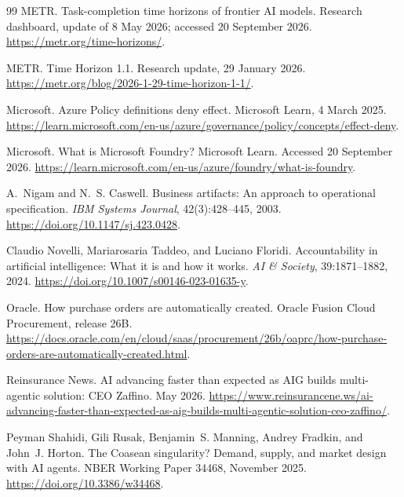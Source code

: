 \begin{thebibliography}{99}
METR.
\newblock Task-completion time horizons of frontier AI models.
\newblock Research dashboard, update of 8 May 2026; accessed 20 September 2026.
\newblock \url{https://metr.org/time-horizons/}.

METR.
\newblock Time Horizon 1.1. Research update, 29 January 2026.
\newblock \url{https://metr.org/blog/2026-1-29-time-horizon-1-1/}.

Microsoft.
\newblock Azure Policy definitions deny effect. Microsoft Learn, 4 March 2025.
\newblock \url{https://learn.microsoft.com/en-us/azure/governance/policy/concepts/effect-deny}.

Microsoft.
\newblock What is Microsoft Foundry? Microsoft Learn.
\newblock Accessed 20 September 2026.
\newblock \url{https://learn.microsoft.com/en-us/azure/foundry/what-is-foundry}.

A.~Nigam and N.~S. Caswell.
\newblock Business artifacts: An approach to operational specification.
\newblock \emph{IBM Systems Journal}, 42(3):428--445, 2003.
\newblock \url{https://doi.org/10.1147/sj.423.0428}.

Claudio Novelli, Mariarosaria Taddeo, and Luciano Floridi.
\newblock Accountability in artificial intelligence: What it is and how it works.
\newblock \emph{AI \& Society}, 39:1871--1882, 2024.
\newblock \url{https://doi.org/10.1007/s00146-023-01635-y}.

Oracle.
\newblock How purchase orders are automatically created. Oracle Fusion Cloud Procurement, release 26B.
\newblock \url{https://docs.oracle.com/en/cloud/saas/procurement/26b/oaprc/how-purchase-orders-are-automatically-created.html}.

Reinsurance News.
\newblock AI advancing faster than expected as AIG builds multi-agentic solution: CEO Zaffino.
 May 2026.
\newblock \url{https://www.reinsurancene.ws/ai-advancing-faster-than-expected-as-aig-builds-multi-agentic-solution-ceo-zaffino/}.

Peyman Shahidi, Gili Rusak, Benjamin~S. Manning, Andrey Fradkin, and John~J. Horton.
\newblock The Coasean singularity? Demand, supply, and market design with AI agents.
\newblock NBER Working Paper 34468, November 2025.
\newblock \url{https://doi.org/10.3386/w34468}.


\end{thebibliography}

